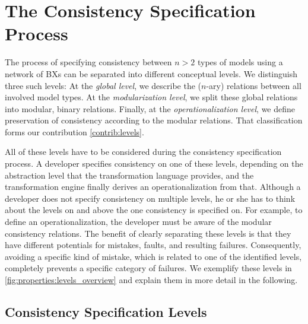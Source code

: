 \section{The Consistency Specification Process}
\label{sec:process}


The process of specifying consistency between $n>2$ types of models using a network of \acp{BX} can be separated into different conceptual levels.
We distinguish three such levels:
At the \emph{global level}, we describe the ($n$-ary) relations between all involved model types.
At the \emph{modularization level}, we split these global relations into modular, binary relations.
Finally, at the \emph{operationalization level}, we define preservation of consistency %
according to the modular relations.
That classification forms our contribution \ref{contrib:levels}.

All of these levels have to be considered during the consistency specification process.
A developer specifies consistency on one of these levels, depending on the abstraction level that the transformation language provides, and the transformation engine finally derives an operationalization from that.
Although a developer does not specify consistency on multiple levels, he or she has to think about the levels on and above the one consistency is specified on.
For example, to define an operationalization, the developer must be aware of the modular consistency relations.
The benefit of clearly separating these levels is that they have different potentials for mistakes, faults, and resulting failures. 
Consequently, avoiding a specific kind of mistake, which is related to one of the identified levels, completely prevents a specific category of failures.
We exemplify these levels in \autoref{fig:properties:levels_overview} and explain them in more detail in the following.


\subsection{Consistency Specification Levels}
\label{sec:process:levels}

